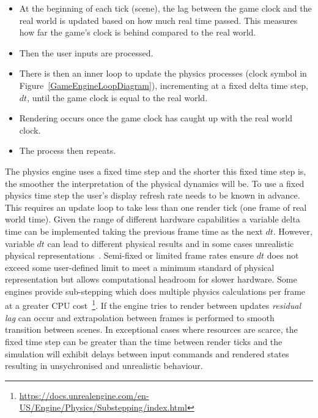\begin{itemize}[leftmargin=*]
    \item At the beginning of each tick (scene), the lag between the game clock and the real world is updated based on how much real time passed. This measures how far the game's clock is behind compared to the real world.
    \item Then the user inputs are processed.
    \item There is then an inner loop to update the physics processes (clock symbol in Figure~\ref{GameEngineLoopDiagram}), incrementing at a fixed delta time step, $dt$, until the game clock is equal to the real world. 
    \item Rendering occurs once the game clock has caught up with the real world clock. 
    \item The process then repeats.
\end{itemize} 

The physics engine uses a fixed time step and %
the shorter this fixed time step is, the smoother the interpretation of the physical dynamics will be. %
%
To use a fixed physics time step the user's display refresh rate needs to be known in advance. This requires an update loop to take less than one render tick (one frame of real world time). Given the range of different hardware capabilities a variable delta time can be implemented taking the previous frame time as the next $dt$. However, variable $dt$ can lead to different physical results and in some cases unrealistic physical representations~\cite{gaffer}. Semi-fixed or limited frame rates ensure $dt$ does not exceed some user-defined limit to meet a minimum standard of physical representation but allows computational headroom for slower hardware. Some engines provide sub-stepping which does multiple physics calculations per frame at a greater CPU cost~\footnote{\url{https://docs.unrealengine.com/en-US/Engine/Physics/Substepping/index.html}}. If the engine tries to render between updates \textit{residual lag} can occur and extrapolation between frames is performed to smooth transition between scenes. %
%
In exceptional cases where resources are scarce, the fixed time step can be greater than the time between render ticks %
and the simulation will exhibit delays between input commands and rendered states resulting in unsychronised and unrealistic behaviour.

